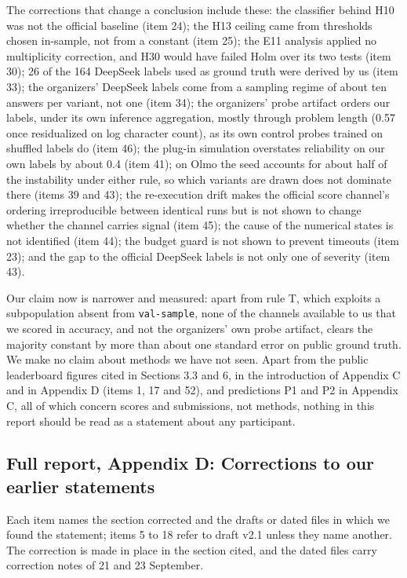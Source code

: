 The corrections that change a conclusion include these: the classifier behind H10 was not the official baseline (item 24); the H13 ceiling came from thresholds chosen in-sample, not from a constant (item 25); the E11 analysis applied no multiplicity correction, and H30 would have failed Holm over its two tests (item 30); 26 of the 164 DeepSeek labels used as ground truth were derived by us (item 33); the organizers' DeepSeek labels come from a sampling regime of about ten answers per variant, not one (item 34); the organizers' probe artifact orders our labels, under its own inference aggregation, mostly through problem length (0.57 once residualized on log character count), as its own control probes trained on shuffled labels do (item 46); the plug-in simulation overstates reliability on our own labels by about 0.4 (item 41); on Olmo the seed accounts for about half of the instability under either rule, so which variants are drawn does not dominate there (items 39 and 43); the re-execution drift makes the official score channel's ordering irreproducible between identical runs but is not shown to change whether the channel carries signal (item 45); the cause of the numerical states is not identified (item 44); the budget guard is not shown to prevent timeouts (item 23); and the gap to the official DeepSeek labels is not only one of severity (item 43).

Our claim now is narrower and measured: apart from rule T, which exploits a subpopulation absent from \texttt{val-sample}, none of the channels available to us that we scored in accuracy, and not the organizers' own probe artifact, clears the majority constant by more than about one standard error on public ground truth. We make no claim about methods we have not seen. Apart from the public leaderboard figures cited in Sections 3.3 and 6, in the introduction of Appendix C and in Appendix D (items 1, 17 and 52), and predictions P1 and P2 in Appendix C, all of which concern scores and submissions, not methods, nothing in this report should be read as a statement about any participant.

\subsection*{Full report, Appendix D: Corrections to our earlier statements}

Each item names the section corrected and the drafts or dated files in which we found the statement; items 5 to 18 refer to draft v2.1 unless they name another. The correction is made in place in the section cited, and the dated files carry correction notes of 21 and 23 September.

